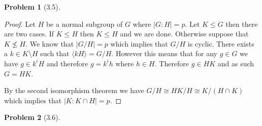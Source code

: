 \documentclass[10pt]{article}
\newcommand{\sk}{\vskip 10mm}
\theoremstyle{plain}
\newtheorem{problem}{Problem}
\theoremstyle{remark}
\begin{document}
\sk

\begin{problem}[3.5] %
  
\end{problem}

\begin{proof}
  Let $H$ be a normal subgroup of $G$ where $|G:H|=p$. Let $K\leq G$ then there are two cases.
  If $K\leq H$ then $K\leq H$ and we are done. Otherwise suppose that $K\nleq H$. We know that
  $|G/H|=p$ which implies that $G/H$ is cyclic. There exists a $k\in K\setminus H$ such that
  $\langle kH\rangle = G/H$. However this means that for any $g\in G$ we have $g\in k^iH$ and therefore
  $g=k^ih$ where $h\in H$. Therefore $g\in HK$ and as such $G=HK$.

  By the second isomorphism theorem we have $G/H\cong HK/H\cong K/(H\cap K)$ which implies that
  $|K:K\cap H|=p$.
\end{proof}

\sk

\begin{problem}[3.6] %
  
\end{problem}
\end{document}
